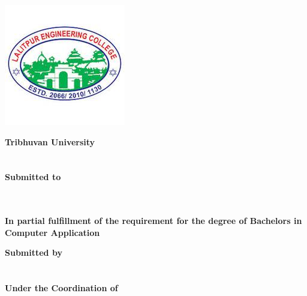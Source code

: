 \begin{center}
\begin{spacing}{1.6}
\thispagestyle{empty}

\includegraphics[scale=0.75]{img/Graphics/LEC.jpeg}

\textbf{
\large{Tribhuvan University}\\
\large{\theinstitute}}\\
\vspace{0.5cm}
\textbf{\MakeUppercase{\thetitle}\\
\vspace{0.5cm} 
Submitted to\\ 
\thedepartment\\
\thecampus}\\
\vspace{0.5cm}

\textbf{In partial fulfillment of the requirement for the degree of Bachelors in Computer Application}
\bigskip

\par

\textbf{
Submitted by\\
\theauthor\\
\MakeUppercase{\thedate}}\\
\vspace{1cm}
\textbf{
Under the Coordination of\\
\thesupervisor
}
\end{spacing}
\end{center}

\clearpage